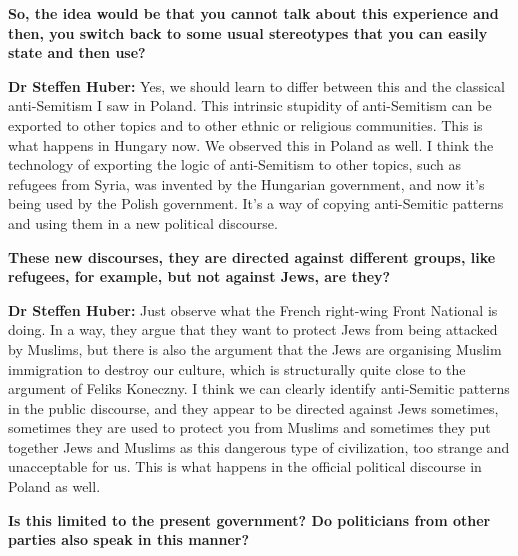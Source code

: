 \textbf{So, the idea would be that you cannot talk about this experience and then, you switch back to some usual stereotypes that you can easily state and then use?} 

\textbf{Dr Steffen Huber:} Yes, we should learn to differ between this and the classical anti-Semitism I saw in Poland. This intrinsic stupidity of anti-Semitism can be exported to other topics and to other ethnic or religious communities. This is what happens in Hungary now. We observed this in Poland as well. I think the technology of exporting the logic of anti-Semitism to other topics, such as refugees from Syria, was invented by the Hungarian government, and now it's being used by the Polish government. It’s a way of copying anti-Semitic patterns and using them in a new political discourse. 

\textbf{These new discourses, they are directed against different groups, like refugees, for example, but not against Jews, are they?}  

\textbf{Dr Steffen Huber:} Just observe what the French right-wing Front National is doing. In a way, they argue that they want to protect Jews from being attacked by Muslims, but there is also the argument that the Jews are organising Muslim immigration to destroy our culture, which is structurally quite close to the argument of Feliks Koneczny. I think we can clearly identify anti-Semitic patterns in the public discourse, and they appear to be directed against Jews sometimes, sometimes they are used to protect you from Muslims and sometimes they put together Jews and Muslims as this dangerous type of civilization, too strange and unacceptable for us. This is what happens in the official political discourse in Poland as well. 

\textbf{Is this limited to the present government? Do politicians from other parties also speak in this manner?} 

